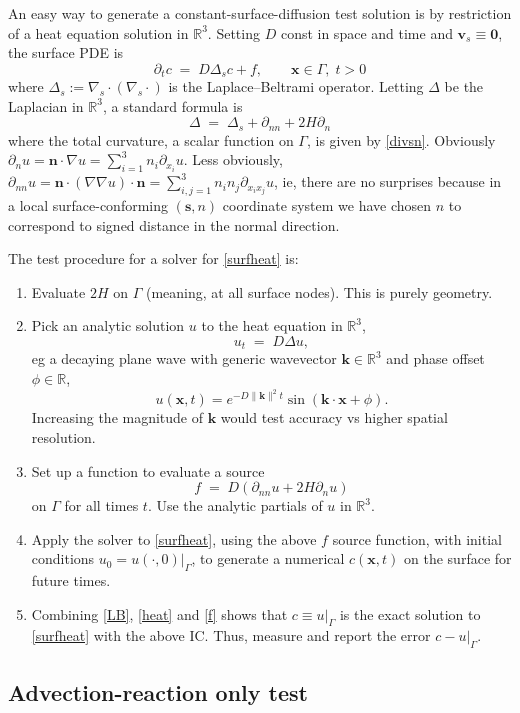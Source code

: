 \documentclass[11pt]{article}
\newcommand{\ben}{\begin{enumerate}}
\newcommand{\een}{\end{enumerate}}
\newcommand{\be}{\begin{equation}}
\newcommand{\ee}{\end{equation}}
\newcommand{\mbf}[1]{{\mathbf #1}}
\newcommand{\R}{\mathbb{R}}
\newcommand{\x}{\mbf{x}}
\newcommand{\n}{\mbf{n}}
\newcommand{\kk}{\mbf{k}}
\newcommand{\vv}{\mbf{v}}
\begin{document}
An easy way to generate a constant-surface-diffusion test solution is
by restriction of a heat equation solution in $\R^3$.
Setting $D$ const in space and time and $\vv_s\equiv\mbf{0}$,
the surface PDE is
\be
\partial_t c \;=\;
D \Delta_s c + f
, \qquad \x\in\Gamma, \;t>0
\label{surfheat}
\ee
where $\Delta_s := \nabla_s\cdot (\nabla_s \cdot)$ is the Laplace--Beltrami
operator.
Letting $\Delta$ be the Laplacian in $\R^3$, a standard formula is
\be
\Delta \;=\; \Delta_s + \partial_{nn} + 2H \partial_n
\label{LB}
\ee
where the total curvature, a scalar function on $\Gamma$,
is given by \eqref{divsn}.
Obviously
$\partial_{n} u= \n \cdot \nabla u = \sum_{i=1}^3 n_i \partial_{x_i} u$.
Less obviously,
$\partial_{nn} u= \n\cdot (\nabla\nabla u) \cdot \n = \sum_{i,j=1}^3 n_i n_j \partial_{x_ix_j} u$, ie, there are no surprises because in a local surface-conforming $(\mbf{s},n)$
coordinate system we have chosen $n$ to correspond to signed distance in the
normal direction.

The test procedure for a solver for \eqref{surfheat} is:
\ben
\item
  Evaluate $2H$ on $\Gamma$ (meaning, at all surface nodes). This
  is purely geometry.
\item Pick an analytic
  solution $u$ to the heat equation in $\R^3$,
  \be
  u_t \;=\;D \Delta u,
  \label{heat}
  \ee
  eg a decaying
  plane wave with generic wavevector $\kk\in\R^3$ and phase offset $\phi\in\R$,
  $$
  u(\x,t) = e^{-D\|\kk\|^2 t} \sin(\kk\cdot \x + \phi).
  $$
  Increasing the magnitude of $\kk$ would test accuracy vs higher spatial
  resolution.
\item
  Set up a function to evaluate a source
  \be
  f \;=\; D(\partial_{nn} u + 2H \partial_n u)
  \label{f}
  \ee
  on $\Gamma$ for all times $t$. Use the analytic partials of $u$ in $\R^3$.
\item
  Apply the solver to \eqref{surfheat}, using the above $f$ source function,
  with initial conditions $u_0 = u(\cdot,0)|_\Gamma$,
  to generate a numerical $c(\x,t)$ on the surface for future times.
\item
  Combining \eqref{LB}, \eqref{heat} and \eqref{f} shows that
  $c \equiv u|_\Gamma$ is the exact solution to \eqref{surfheat} with the above
  IC.
  Thus, measure and report the error $c - u|_\Gamma$.
\een

\subsection{Advection-reaction only test}
\end{document}
